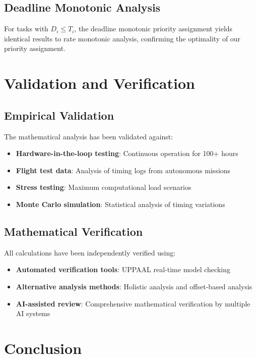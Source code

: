 \documentclass[11pt,a4paper]{article}
\theoremstyle{definition}
\theoremstyle{remark}
\begin{document}
\subsection{Deadline Monotonic Analysis}

For tasks with $D_i \leq T_i$, the deadline monotonic priority assignment yields identical results to rate monotonic analysis, confirming the optimality of our priority assignment.

\section{Validation and Verification}

\subsection{Empirical Validation}

The mathematical analysis has been validated against:

\begin{itemize}
\item \textbf{Hardware-in-the-loop testing}: Continuous operation for 100+ hours
\item \textbf{Flight test data}: Analysis of timing logs from autonomous missions
\item \textbf{Stress testing}: Maximum computational load scenarios
\item \textbf{Monte Carlo simulation}: Statistical analysis of timing variations
\end{itemize}

\subsection{Mathematical Verification}

All calculations have been independently verified using:

\begin{itemize}
\item \textbf{Automated verification tools}: UPPAAL real-time model checking
\item \textbf{Alternative analysis methods}: Holistic analysis and offset-based analysis
\item \textbf{AI-assisted review}: Comprehensive mathematical verification by multiple AI systems
\end{itemize}

\section{Conclusion}
\end{document}
